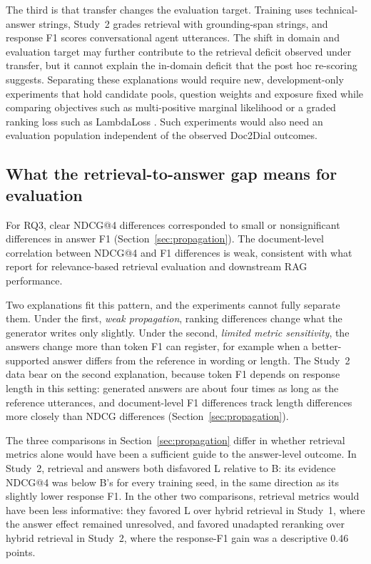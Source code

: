 The third is that transfer changes the evaluation target. Training uses technical-answer strings, Study~2 grades retrieval with grounding-span strings, and response F1 scores conversational agent utterances. The shift in domain and evaluation target may further contribute to the retrieval deficit observed under transfer, but it cannot explain the in-domain deficit that the post hoc re-scoring suggests. Separating these explanations would require new, development-only experiments that hold candidate pools, question weights and exposure fixed while comparing objectives such as multi-positive marginal likelihood \citep{zhang2025utility} or a graded ranking loss such as LambdaLoss \citep{wang2018lambda}. Such experiments would also need an evaluation population independent of the observed Doc2Dial outcomes.

\subsection{What the retrieval-to-answer gap means for evaluation}\label{sec:evaluation}
For RQ3, clear NDCG@4 differences corresponded to small or nonsignificant differences in answer F1 (Section~\ref{sec:propagation}). The document-level correlation between NDCG@4 and F1 differences is weak, consistent with what \citet{salemi2024} report for relevance-based retrieval evaluation and downstream RAG performance.

Two explanations fit this pattern, and the experiments cannot fully separate them. Under the first, \emph{weak propagation}, ranking differences change what the generator writes only slightly. Under the second, \emph{limited metric sensitivity}, the answers change more than token F1 can register, for example when a better-supported answer differs from the reference in wording or length. The Study~2 data bear on the second explanation, because token F1 depends on response length in this setting: generated answers are about four times as long as the reference utterances, and document-level F1 differences track length differences more closely than NDCG differences (Section~\ref{sec:propagation}).

The three comparisons in Section~\ref{sec:propagation} differ in whether retrieval metrics alone would have been a sufficient guide to the answer-level outcome. In Study~2, retrieval and answers both disfavored L relative to B: its evidence NDCG@4 was below B's for every training seed, in the same direction as its slightly lower response F1. In the other two comparisons, retrieval metrics would have been less informative: they favored L over hybrid retrieval in Study~1, where the answer effect remained unresolved, and favored unadapted reranking over hybrid retrieval in Study~2, where the response-F1 gain was a descriptive 0.46 points.

